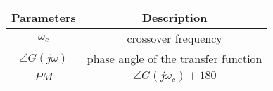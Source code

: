 \begin{tabular}{|c|c|}
\hline
\textbf{Parameters} & \textbf{Description} \\
\hline
$\omega_c$ & crossover frequency \\
\hline
$\angle G(j\omega)$ & phase angle of the transfer function \\
\hline
$PM$ & $\angle G(j\omega_c)+180$\\
\hline
\end{tabular}
